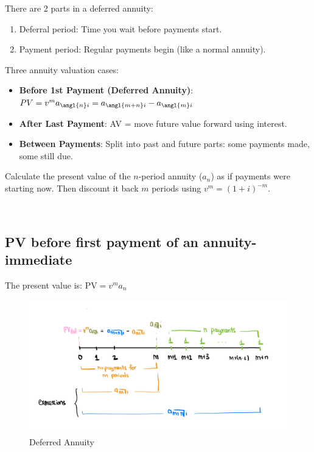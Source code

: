 \begin{comments}
    There are 2 parts in a deferred annuity: 
    \begin{enumerate}
        \item Deferral period: Time you wait before payments start.
        \item Payment period: Regular payments begin (like a normal annuity).
    \end{enumerate} 
    \break

    Three annuity valuation cases: 
    \begin{itemize}
        \item \textbf{Before 1st Payment (Deferred Annuity)}: $PV=v^m a_{\angl{n}i} = a_{\angl{m+n}i} - a_{\angl{m}i}$
        \item \textbf{After Last Payment}: AV = move future value forward using interest.
        \item \textbf{Between Payments}: Split into past and future parts: some payments made, some still due.
    \end{itemize}
\end{comments}
\begin{comments}
Calculate the present value of the \( n \)-period annuity (\( a_n \)) as if payments were starting now. Then discount it back \( m \) periods using \( v^m = (1 + i)^{-m} \).
\end{comments} \\

\subsection{PV before first payment of an annuity-immediate}

\begin{theorem}
The present value is:
$\text{PV} = v^m a_n$
\end{theorem}


\begin{figure}
  \centering
  \includegraphics[width=1.0\linewidth]{images/deferred_annuity.JPG}
  \caption{Deferred Annuity}
  \label{fig:enter-label}
\end{figure}


